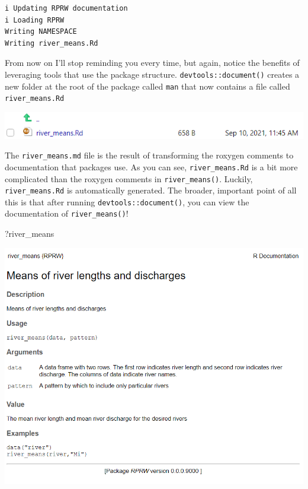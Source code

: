 \documentclass[
]{book}
\newenvironment{Shaded}{\begin{snugshade}}{\end{snugshade}}
\newcommand{\NormalTok}[1]{#1}
\begin{document}
\begin{verbatim}
i Updating RPRW documentation
i Loading RPRW
Writing NAMESPACE
Writing river_means.Rd
\end{verbatim}

From now on I'll stop reminding you every time, but again, notice the benefits of leveraging tools that use the package structure. \texttt{devtools::document()} creates a new folder at the root of the package called \texttt{man} that now contains a file called \texttt{river\_means.Rd}

\includegraphics[width=1\linewidth]{images/newrpack_files2}

The \texttt{river\_means.md} file is the result of transforming the roxygen comments to documentation that packages use. As you can see, \texttt{river\_means.Rd} is a bit more complicated than the roxygen comments in \texttt{river\_means()}. Luckily, \texttt{river\_means.Rd} is automatically generated. The broader, important point of all this is that after running \texttt{devtools::document()}, you can view the documentation of \texttt{river\_means()}!

\begin{Shaded}
\begin{Highlighting}[]
\NormalTok{?river_means}
\end{Highlighting}
\end{Shaded}

\includegraphics[width=1\linewidth]{images/newrpack_example}
\end{document}
